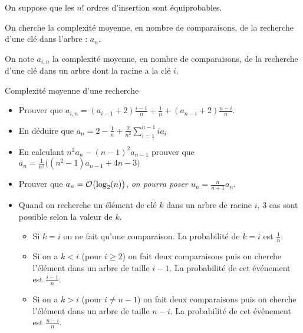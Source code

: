On suppose que les $n!$ ordres d'insertion sont équiprobables.

On cherche la complexité moyenne, en nombre de comparaisons, de la recherche d'une clé dans l'arbre : $a_n$.

On note $a_{i,n}$ la complexité moyenne, en nombre de comparaisons, de la recherche d'une clé dans un arbre dont la racine a la clé $i$.
\begin{exo}{Complexité moyenne d'une recherche}{}

\begin{itemize}
\item Prouver que $\displaystyle a_{i,n}=(a_{i-1}+2)\frac{i-1}n+\frac 1n+(a_{n-i}+2)\frac{n-i}n$.

\item En déduire que $\displaystyle a_n = 2 - \frac1n +\frac 2{n^2}\sum_{i=1}^{n-1} ia_i$

\item En calculant $n^2a_n-(n-1)^2a_{n-1}$ prouver que $\displaystyle a_n= \frac 1{n^2}\bigl((n^2-1)a_{n-1}+4n-3\bigr)$ 

\item Prouver que $a_n={\cal O}\bigl(\log_2(n)\bigr)$, {\it on pourra poser $u_n=\frac n{n+1}a_n$}.
\end{itemize}
\reponse
\begin{itemize}
\item Quand on recherche un élément de clé $k$ dans un arbre de racine $i$, 3 cas sont possible selon la valeur de $k$.

\begin{itemize}
\item Si $k=i$ on ne fait qu'une comparaison. La probabilité de $k=i$ est $\frac 1n$.
\item Si on a $k < i$ (pour $i\ge 2$) on fait deux comparaisons puis on cherche l'élément dans un arbre de taille $i-1$. La probabilité de cet événement est $\frac{i-1}n$.
\item Si on a $k > i$ (pour $i\ne n-1$) on fait deux comparaisons puis on cherche l'élément dans un arbre de taille $n-i$. La probabilité de cet événement est $\frac{n-i}n$.
\end{itemize} 


\end{itemize}
\end{exo}
